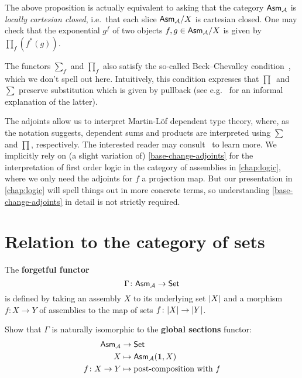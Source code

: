 The above proposition is actually equivalent to asking that the category
\(\mathsf{Asm}_{\mathcal A}\) is \emph{locally cartesian closed}, i.e.\ that each slice
\(\mathsf{Asm}_{\mathcal A}/X\) is cartesian closed.
%
One may check that the exponential \(g^f\) of two objects
\(f,g \in \mathsf{Asm}_{\mathcal A}/X\) is given by \(\prod_f(f^\ast(g))\).

The functors \(\sum_f\) and \(\prod_f\) also satisfy the so-called
Beck--Chevalley condition~\cite[Theorem~4.4]{Streicher2018}, which we don't
spell out here. Intuitively, this condition expresses that
\(\prod\)~and~\(\sum\) preserve substitution which is given by pullback (see
e.g.~\cite{Bauer2012} for an informal explanation of the latter).

The adjoints allow us to interpret Martin-L\"of dependent type theory, where, as
the notation suggests, dependent sums and products are interpreted using
\(\sum\) and \(\prod\), respectively. The interested reader may
consult~\cite{Seely1984,Jacobs1999,Streicher1991} to learn more.
%
We implicitly rely on (a slight variation of) \cref{base-change-adjoints} for
the interpretation of first order logic in the category of assemblies in
\cref{chap:logic}, where we only need the adjoints for \(f\) a projection
map.
%
But our presentation in \cref{chap:logic} will spell things out in more concrete
terms, so understanding \cref{base-change-adjoints} in detail is not strictly
required.

\section{Relation to the category of sets}

\begin{definition}
  The \textbf{forgetful functor}
  \[
    \Gamma \colon \mathsf{Asm}_{\mathcal A} \to \mathsf{Set}
  \]
  is defined by taking an assembly \(X\) to its underlying set \(\lvert X\rvert\)
  and a morphism \(f \colon X \to Y\) of assemblies to the map of sets
  \(f \colon \lvert X\rvert \to \lvert Y\rvert\).
\end{definition}

\begin{exercise}\label{exer:Gamma-global-sections}
  Show that \(\Gamma\) is naturally isomorphic to the \textbf{global sections}
  functor:
  \begin{align*}
    \mathsf{Asm}_{\mathcal A} &\to \mathsf{Set} \\
    X &\mapsto \mathsf{Asm}_{\mathcal A}(\mathbf 1,X) \\
    f \colon X \to Y &\mapsto \text{post-composition with \(f\)}
  \end{align*}
\end{exercise}

